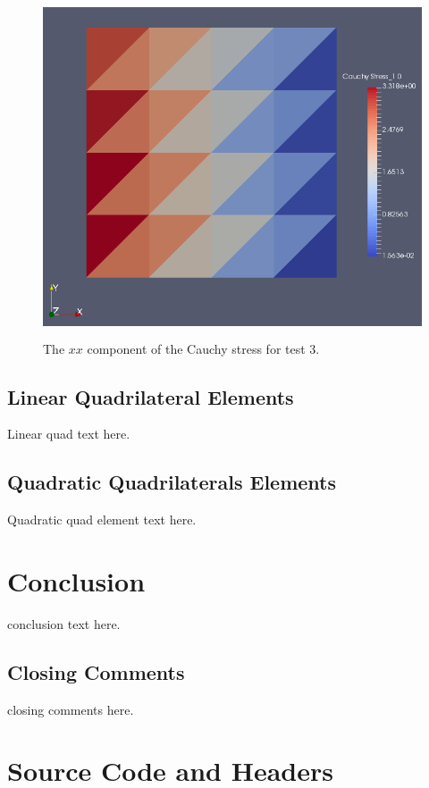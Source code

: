 \documentclass[a4paper, 12pt]{article}
\begin{document}
\begin{figure}[H]
  \centering
  \includegraphics[width=13cm, height=10cm]{Qtri_4_t3_Sxx}
  \caption{The $xx$ component of the Cauchy stress for test 3.}
  \label{fig:quadTri3_SXX}
\end{figure}

\subsection{Linear Quadrilateral Elements} \label{subsec:linQuads}
Linear quad text here.

\subsection{Quadratic Quadrilaterals Elements} \label{subsec:quadQuads}
Quadratic quad element text here.

\section{Conclusion} \label{sec:conclusion}
conclusion text here.

\subsection{Closing Comments} \label{sec:comments}
closing comments here.

\newpage
\appendix
\section{Source Code and Headers} \label{sec:code}
\end{document}

